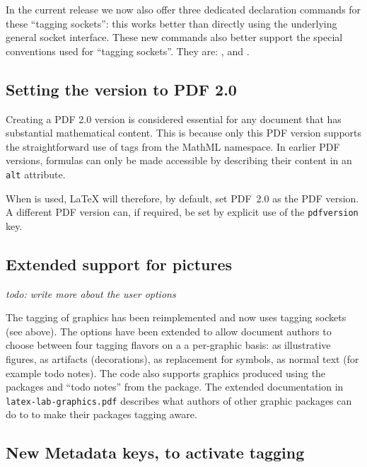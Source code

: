 \documentclass{ltnews}
\begin{document}
In the current release we now also offer three dedicated declaration
commands for these \enquote{tagging sockets}: this works better than 
directly using the underlying general socket interface. 
These new commands also better support the
special conventions used for \enquote{tagging sockets}. They are:  
,  and
.


\subsection{Setting the version to PDF 2.0}

Creating a PDF 2.0 version is considered essential for any document that has 
substantial mathematical content.  This is because only this PDF version supports 
the straightforward use of tags from the 
MathML namespace.
%
In earlier PDF versions, formulas can only be made accessible by
describing their content in an \texttt{alt} attribute.
%

When  is used, \LaTeX{}
will therefore, by default, set PDF~2.0 as the PDF version.
A different PDF version can, if required, be set by explicit use of 
the \texttt{pdfversion} key.


\subsection{Extended support for pictures}

\emph{todo: write more about the user options}

The tagging of graphics has been reimplemented and now uses tagging
sockets (see above).  The options have been extended to allow document
authors to choose between four tagging flavors on a a per-graphic
basis: as illustrative figures, as artifacts (decorations), as
replacement for symbols, as normal text (for example todo notes).
The code also supports graphics produced using the  packages
and \enquote{todo notes} from the  package.  The
extended documentation in \texttt{latex-lab-graphics.pdf} describes
what authors of other graphic packages can do to to make their
packages tagging aware.


\subsection{New Metadata keys, to activate tagging}
\end{document}
